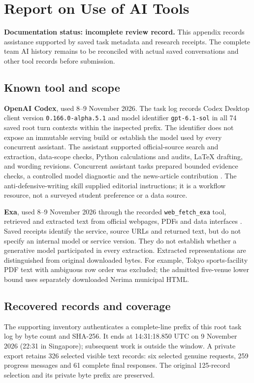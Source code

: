 \section*{Report on Use of AI Tools}
\textbf{Documentation status: incomplete review record.}
This appendix records assistance supported by saved task metadata and research
receipts. The complete team AI history remains to be reconciled with actual
saved conversations and other tool records before submission.

\subsection*{Known tool and scope}
\textbf{OpenAI Codex}, used 8--9 November 2026. The task log records Codex
Desktop client version \texttt{0.166.0-alpha.5.1} and model identifier
\texttt{gpt-6.1-sol} in all 74 saved root turn contexts within the inspected prefix.
The identifier does not expose an immutable serving build or establish the
model used by every concurrent assistant. The assistant supported official-source
search and extraction, data-scope checks, Python calculations and audits,
LaTeX drafting, and wording revisions. Concurrent assistant tasks prepared
bounded evidence checks, a controlled model diagnostic and the news-article
contribution \cite{openai}. The anti-defensive-writing skill supplied editorial instructions;
it is a workflow resource, not a surveyed student preference or a data source.

\textbf{Exa}, used 8--9 November 2026 through the recorded
\texttt{web\_fetch\_exa} tool, retrieved and extracted text from official
webpages, PDFs and data interfaces \cite{exa}. Saved receipts identify the
service, source URLs and returned text, but do not specify an internal model
or service version. They do not establish whether a generative model
participated in every extraction. Extracted representations are distinguished
from original downloaded bytes. For example, Tokyo sports-facility PDF text
with ambiguous row order was excluded; the admitted five-venue lower bound
uses separately downloaded Nerima municipal HTML.

\clearpage
\subsection*{Recovered records and coverage}
The supporting inventory authenticates a complete-line prefix of this root
task log by byte count and SHA-256. It ends at 14:31:18.850 UTC on
9 November 2026 (22:31 in Singapore); subsequent work is outside the window.
A private export retains 326 selected visible text records: six selected
genuine requests, 259 progress messages and 61 complete final responses.
The original 125-record selection and its private byte prefix are preserved.

